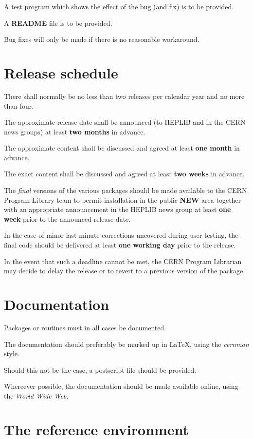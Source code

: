 A test program which shows the effect of the bug (and fix)
is to be provided.

A {\bf README} file is to be provided.

Bug fixes will only be made if there is no reasonable
workaround.

\section{Release schedule}

There shall normally be no less than two releases per calendar
year and no more than four.

The approximate release date shall be announced (to HEPLIB
and in the CERN news groups) at least {\bf two months} in advance.

The approximate content shall be discussed and agreed at
least {\bf one month} in advance.

The exact content shall be discussed and agreed at least
{\bf two weeks} in advance.

The {\it final} versions of the various packages should be
made available to the CERN Program Library team to permit
installation in the public {\bf NEW} area together
with an appropriate announcement in the HEPLIB news group
at least {\bf one week} prior to the announced release date.

In the case of minor last minute corrections uncovered
during user testing, the final code
should be delivered at least {\bf one working day} prior to
the release.

In the event that such a deadline cannot be met, the
CERN Program Librarian may decide to delay the release
or to revert to a previous version of the package.

\section{Documentation}

Packages or routines must in all cases be documented.

The documentation should preferably be marked up in
\LaTeX, using the {\it cernman} style.

Should this not be the case, a postscript file should
be provided.

Whereever possible, the documentation should be made
available online, using the {\it World Wide Web}.

\section{The reference environment}

